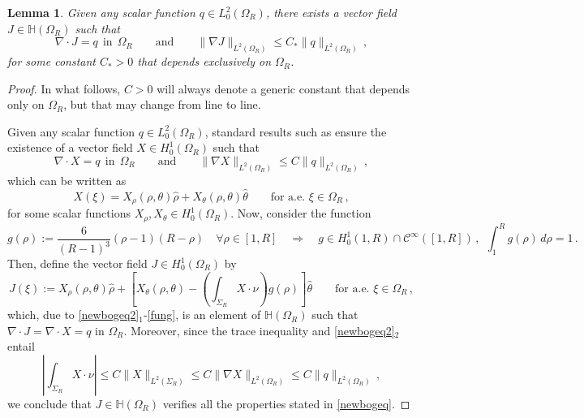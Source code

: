 \documentclass[a4paper,11pt]{article}
\newtheorem{lemma}[theorem]{Lemma}
\numberwithin{equation}{section}
\numberwithin{figure}{section}
\begin{document}
\begin{lemma} \label{newbogovskii}
Given any scalar function $q \in L^2_0(\Omega_{R})$, there exists a vector field $J \in \mathbb{H}(\Omega_{R})$ such that
\begin{equation} \label{newbogeq}
 \nabla \cdot J = q \ \ \mbox{in} \ \ \Omega_{R} \qquad \text{and} \qquad \| \nabla J \|_{L^{2}(\Omega_{R})} \leq C_{*} \| q \|_{L^{2}(\Omega_{R})} \, ,
\end{equation}
	for some constant $C_{*} > 0$ that depends exclusively on $\Omega_{R}$.
\end{lemma}
\noindent
\begin{proof}
In what follows, $C > 0$ will always denote a generic constant that depends only on $\Omega_{R}$, but that may change from line to line.

Given any scalar function $q \in L^2_0(\Omega_{R})$, standard results such as \cite[Lemma 1.8.13]{korobkov2024steady} ensure the existence of a vector field $X \in H_{0}^{1}(\Omega_{R})$ such that
\begin{equation} \label{newbogeq2}
	\nabla \cdot X = q \ \ \mbox{in} \ \ \Omega_{R} \qquad \text{and} \qquad \| \nabla X \|_{L^{2}(\Omega_{R})} \leq C \| q \|_{L^{2}(\Omega_{R})} \, ,
\end{equation}
which can be written as
$$
X(\xi) = X_{\rho}(\rho, \theta) \widehat{\rho} + X_{\theta}(\rho,\theta) \widehat{\theta} \qquad \text{for a.e. }\xi \in \Omega_{R}
\, ,
$$
for some scalar functions $X_{\rho}, X_{\theta}  \in H_{0}^{1}(\Omega_{R})$. Now, consider the function
\begin{equation} \label{fung}
g(\rho) := \dfrac{6}{(R - 1)^{3}} (\rho - 1)(R - \rho) \quad \forall \rho \in [1,R] \quad \Longrightarrow \quad g \in H_{0}^{1}(1,R) \cap \mathcal{C}^{\infty}([1,R]) \, , \ \ \int_{1}^{R} g(\rho) \, d\rho = 1 \, .
\end{equation}
Then, define the vector field $J \in H_{0}^{1}(\Omega_{R})$ by
$$
J(\xi) := X_{\rho}(\rho, \theta) \widehat{\rho} + \left[ X_{\theta}(\rho, \theta) - \left( \int_{\Sigma_{R}} X \cdot \nu \right) g(\rho) \right] \widehat{\theta} \qquad \text{for a.e. }\xi \in \Omega_{R} \, ,
$$
which, due to \eqref{newbogeq2}$_1$-\eqref{fung}, is an element of $\mathbb{H}(\Omega_{R})$ such that $\nabla \cdot J = \nabla \cdot X = q$ in $\Omega_{R}$. Moreover, since the trace inequality and \eqref{newbogeq2}$_2$ entail
$$
\left| \int_{\Sigma_{R}} X \cdot \nu \right| \leq C \| X \|_{L^{2}(\Sigma_{R})} \leq C \| \nabla X \|_{L^{2}(\Omega_{R})} \leq C \| q \|_{L^{2}(\Omega_{R})} \, ,
$$
we conclude that $J \in \mathbb{H}(\Omega_{R})$ verifies all the properties stated in \eqref{newbogeq}.
\end{proof}
\end{document}
